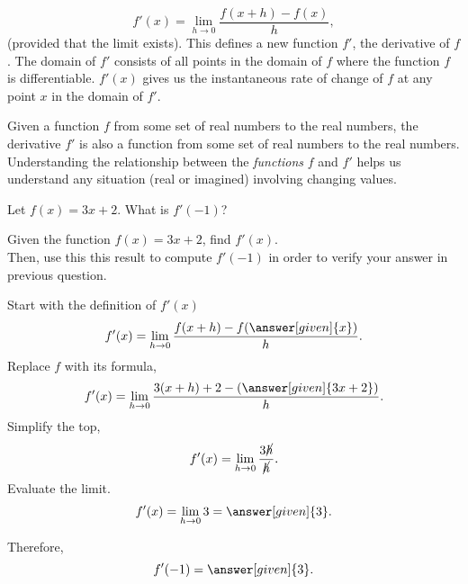 \documentclass{ximera}
\begin{document}
\[
f'(x) = \lim_{h\to 0}\frac{f(x+h)-f(x)}{h},
\]
(provided that the limit exists).
This defines a new function $f'$, the derivative of $f$. The domain of $f'$ consists of all points in the domain of $f$ where the function $f$ is differentiable.
$f'(x)$ gives us the instantaneous rate of change of $f$ at any point $x$ in the domain of $f'$.\\
\begin{comment}
\begin{warning}
  The notation:
  \begin{quote}
  $f'(a)$ means take the derivative of $f$ first, then evaluate at
    $x=a$.
  \end{quote}
  In other words, given $f$ a function of $x$
  \[
  f'(a) = \eval{\ddx f(x)}_{x=a}.
  \]
\end{warning}
\end{comment}
Given a function $f$ from  some set of real numbers to the real numbers, the
derivative $f'$ is also a function from some set of real numbers to the real
numbers. Understanding the relationship between the \textit{functions}
$f$ and $f'$ helps us understand any situation (real or imagined)
involving changing values.

\begin{question}
  Let $f(x) = 3x+2$. What is $f'(-1)$?
  \begin{multipleChoice}
  \end{multipleChoice}
\end{question}
\begin{example}
	Given the function $f(x) = 3x+2$, find  $f'(x)$. \\
	Then, use this this result to compute $f'(-1)$ in order to verify your answer in previous question.
	\begin{explanation}
		Start with the definition of $f'(x)$
		\[
		f'(x) = \lim_{h\to0}\frac{f(x+h)-f(\answer[given]{x})}{h}.
		\]
		Replace $f$ with its formula,
		\[
		f'(x) = \lim_{h\to0}\frac{3(x+h)+2-\left(\answer[given]{3x+2}\right)}{h}.
		\]
		Simplify the top,
		\[
		f'(x) = \lim_{h\to0}\frac{3\cancel{h}}{\cancel{h}}.
		\]
		Evaluate the limit.		
		\[
		f'(x) = \lim_{h\to0}{3}=\answer[given]{3}.
		\]

		
		Therefore,
		\[
		f'(-1) = \answer[given]{3}.
		\]
	\end{explanation}
\end{example}
\end{document}
